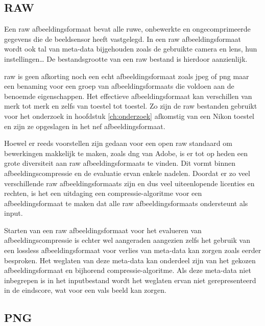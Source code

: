 \subsection{RAW}
\label{sec:afbeeldingscompressie-raw}

Een \gls{raw} \gls{afbeeldingsformaat} bevat alle ruwe, onbewerkte en ongecomprimeerde gegevens die de beeldsensor heeft vastgelegd. In een \gls{raw} \gls{afbeeldingsformaat} wordt ook tal van \gls{meta-data} bijgehouden zoals de gebruikte camera en lens, hun instellingen… De bestandsgrootte van een \gls{raw} bestand is hierdoor aanzienlijk. 

\Gls{raw} is geen afkorting noch een echt \gls{afbeeldingsformaat} zoals \gls{jpeg} of \gls{png} maar een benaming voor een groep van \glspl{afbeeldingsformaat} die voldoen aan de benoemde eigenschappen. Het effectieve \gls{afbeeldingsformaat} kan verschillen van merk tot merk en zelfs van toestel tot toestel. Zo zijn de \gls{raw} bestanden gebruikt voor het onderzoek in hoofdstuk \ref{ch:onderzoek} afkomstig van een Nikon toestel en zijn ze opgeslagen in het \gls{nef} \gls{afbeeldingsformaat}.

Hoewel er reeds voorstellen zijn gedaan voor een open \gls{raw} standaard om bewerkingen makkelijk te maken, zoals \gls{dng} van Adobe, is er tot op heden een grote diversiteit aan \gls{raw} \glspl{afbeeldingsformaat} te vinden. Dit vormt binnen \gls{afbeeldingscompressie} en de evaluatie ervan enkele nadelen. Doordat er zo veel verschillende \gls{raw} \glspl{afbeeldingsformaat} zijn en dus veel uiteenlopende licenties en rechten, is het een uitdaging een \gls{compressie-algoritme} voor een \gls{afbeeldingsformaat} te maken dat alle \gls{raw} \glspl{afbeeldingsformaat} ondersteunt als input. 

Starten van een \gls{raw} \gls{afbeeldingsformaat} voor het evalueren van \gls{afbeeldingscompressie} is echter wel aangeraden aangezien zelfs het gebruik van een \gls{lossless} \gls{afbeeldingsformaat} voor verlies van \gls{meta-data} kan zorgen zoals eerder besproken. Het weglaten van deze \gls{meta-data} kan onderdeel zijn van het gekozen \gls{afbeeldingsformaat} en bijhorend \gls{compressie-algoritme}. Als deze \gls{meta-data} niet inbegrepen is in het inputbestand wordt het weglaten ervan niet gerepresenteerd in de eindscore, wat voor een vals beeld kan zorgen.

\subsection{PNG}
\label{sec:afbeeldingscompressie-png}

